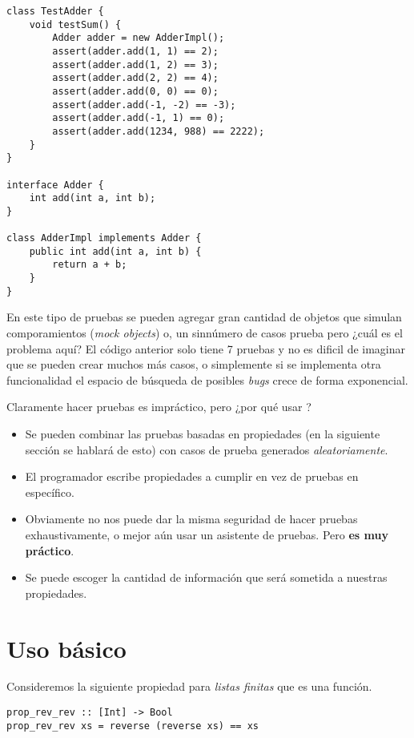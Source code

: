 \begin{verbatim}
class TestAdder {
    void testSum() {
        Adder adder = new AdderImpl();
        assert(adder.add(1, 1) == 2);
        assert(adder.add(1, 2) == 3);
        assert(adder.add(2, 2) == 4);
        assert(adder.add(0, 0) == 0);
        assert(adder.add(-1, -2) == -3);
        assert(adder.add(-1, 1) == 0);
        assert(adder.add(1234, 988) == 2222);
    }
}

interface Adder {
    int add(int a, int b);
}

class AdderImpl implements Adder {
    public int add(int a, int b) {
        return a + b;
    }
}
\end{verbatim}

En este tipo de pruebas se pueden agregar gran cantidad de objetos que simulan comporamientos 
(\textit{mock objects}) o, un sinnúmero de casos prueba pero ¿cuál es el problema aquí? El código
anterior solo tiene 7 pruebas y no es dificil de imaginar que se pueden crear muchos más casos, o
simplemente si se implementa otra funcionalidad el espacio de búsqueda de posibles \textit{bugs}
crece de forma exponencial.

Claramente hacer pruebas es impráctico, pero ¿por qué usar \QuickCheck?
\begin{itemize}
\item Se pueden combinar las pruebas basadas en propiedades (en la siguiente sección se hablará
de esto) con casos de prueba generados \textit{aleatoriamente}.
\item El programador escribe propiedades a cumplir en vez de pruebas en específico.
\item Obviamente no nos puede dar la misma seguridad de hacer pruebas exhaustivamente, o mejor
aún usar un asistente de pruebas. Pero \textbf{es muy práctico}.
\item Se puede escoger la cantidad de información que será sometida a nuestras propiedades.
\end{itemize}


\section{Uso básico}

Consideremos la siguiente propiedad para \textit{listas finitas} que es una función.
\begin{verbatim}
prop_rev_rev :: [Int] -> Bool
prop_rev_rev xs = reverse (reverse xs) == xs
\end{verbatim}


